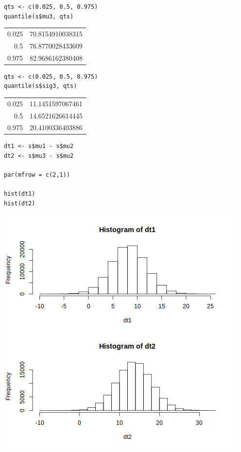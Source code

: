 \documentclass[11pt]{article}
\begin{document}
\begin{verbatim}
qts <- c(0.025, 0.5, 0.975)
quantile(s$mu3, qts)
\end{verbatim}

\begin{center}
\begin{tabular}{rr}
0.025 & 70.8154910038315\\
0.5 & 76.8770028433609\\
0.975 & 82.9686162380408\\
\end{tabular}
\end{center}

\begin{verbatim}
qts <- c(0.025, 0.5, 0.975)
quantile(s$sig3, qts)
\end{verbatim}

\begin{center}
\begin{tabular}{rr}
0.025 & 11.1451597067461\\
0.5 & 14.6521626614445\\
0.975 & 20.4100336403886\\
\end{tabular}
\end{center}

\begin{verbatim}
dt1 <- s$mu1 - s$mu2
dt2 <- s$mu3 - s$mu2

par(mfrow = c(2,1))

hist(dt1)
hist(dt2)
\end{verbatim}

\begin{center}
\includegraphics[width=.9\linewidth]{fig4.png}
\end{center}
\end{document}
